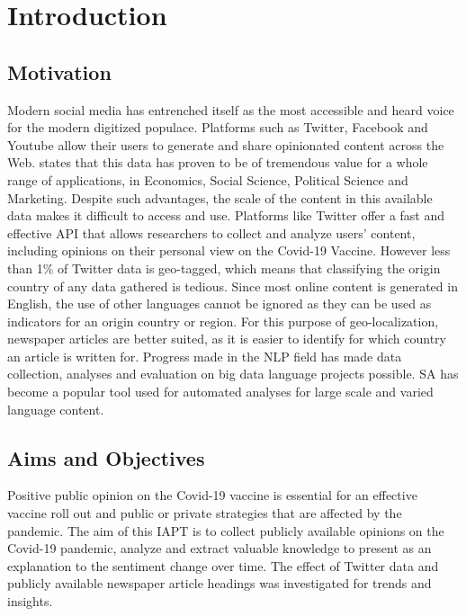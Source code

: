 \chapter{Introduction}


\section{Motivation} %

Modern social media has entrenched itself as the most accessible and heard voice for the modern digitized populace.
Platforms such as Twitter, Facebook and Youtube allow their users to generate and share opinionated content across the Web.
\citet{Balahur2014} states that this data has proven to be of tremendous value for a whole range of applications, in Economics, Social Science, Political Science and Marketing.
Despite such advantages, the scale of the content in this available data makes it difficult to access and use.
Platforms like Twitter offer a fast and effective \ac{API} that allows researchers to collect and analyze users' content, including opinions on their personal view on the Covid-19 Vaccine.
However less than 1\% of Twitter data is geo-tagged, which means that classifying the origin country of any data gathered is tedious.
Since most online content is generated in English, the use of other languages cannot be ignored as they can be used as indicators for an origin country or region.
For this purpose of geo-localization, newspaper articles are better suited, as it is easier to identify for which country an article is written for.
Progress made in the \ac{NLP} field has made data collection, analyses and evaluation on big data language projects possible.
\ac{SA} has become a popular tool used for automated analyses for large scale and varied language content.





\section{Aims and Objectives}

Positive public opinion on the Covid-19 vaccine is essential for an effective vaccine roll out and public or private strategies that are affected by the pandemic.
The aim of this \ac{IAPT} is to collect publicly available opinions on the Covid-19 pandemic, analyze and extract valuable knowledge to present as an explanation to the sentiment change over time.
The effect of Twitter data and publicly available newspaper article headings was investigated for trends and insights.

